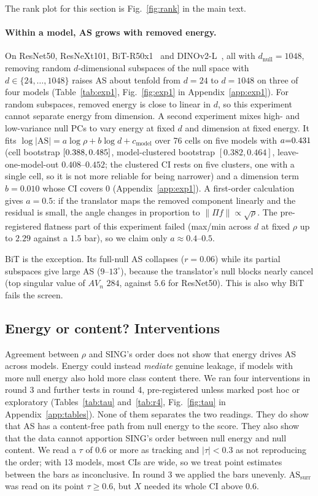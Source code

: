 \documentclass[10pt]{article}
\newcommand{\ASsurr}{\mathrm{AS}_{\mathrm{surr}}}
\begin{document}
The rank plot for this section is Fig.~\ref{fig:rank} in the main text.

\paragraph{Within a model, AS grows with removed energy.}
On ResNet50, ResNeXt101, BiT-R50x1~\citep{bit2020} and DINOv2-L~\citep{dinov2}, all with $d_{\mathrm{null}}{=}1048$, removing random $d$-dimensional subspaces of the null space with $d\in\{24,\dots,1048\}$ raises AS about tenfold from $d{=}24$ to $d{=}1048$ on three of four models (Table~\ref{tab:exp1}, Fig.~\ref{fig:exp1} in Appendix~\ref{app:exp1}).
For random subspaces, removed energy is close to linear in $d$, so this experiment cannot separate energy from dimension.
A second experiment mixes high- and low-variance null PCs to vary energy at fixed $d$ and dimension at fixed energy.
It fits $\log|\mathrm{AS}|=a\log\rho+b\log d+c_{\mathrm{model}}$ over 76 cells on five models with $a{=}0.431$ (cell bootstrap $[0.388,0.485]$, model-clustered bootstrap $[0.382,0.464]$, leave-one-model-out $0.408$--$0.452$; the clustered CI rests on five clusters, one with a single cell, so it is not more reliable for being narrower) and a dimension term $b{=}0.010$ whose CI covers 0 (Appendix~\ref{app:exp1}).
A first-order calculation gives $a{=}0.5$: if the translator maps the removed component linearly and the residual is small, the angle changes in proportion to $\|\Pi f\|\propto\sqrt\rho$.
The pre-registered flatness part of this experiment failed (max/min across $d$ at fixed $\rho$ up to $2.29$ against a $1.5$ bar), so we claim only $a\approx0.4$--$0.5$.

BiT is the exception.
Its full-null AS collapses ($r{=}0.06$) while its partial subspaces give large AS ($9$--$13^\circ$), because the translator's null blocks nearly cancel (top singular value of $AV_n$ $284$, against $5.6$ for ResNet50).
This is also why BiT fails the screen.
\subsection{Energy or content? Interventions}
\label{sec:interv}
Agreement between $\rho$ and SING's order does not show that energy drives AS across models.
Energy could instead \emph{mediate} genuine leakage, if models with more null energy also hold more class content there.
We ran four interventions in round 3 and further tests in round 4, pre-registered unless marked post hoc or exploratory (Tables~\ref{tab:tau} and~\ref{tab:r4}, Fig.~\ref{fig:tau} in Appendix~\ref{app:tables}).
None of them separates the two readings.
They do show that AS has a content-free path from null energy to the score. They also show that the data cannot apportion SING's order between null energy and null content.
We read a $\tau$ of $0.6$ or more as tracking and $|\tau|<0.3$ as not reproducing the order; with 13 models, most CIs are wide, so we treat point estimates between the bars as inconclusive.
In round 3 we applied the bars unevenly. $\ASsurr$ was read on its point $\tau\ge0.6$, but $X$ needed its whole CI above $0.6$.
\end{document}
